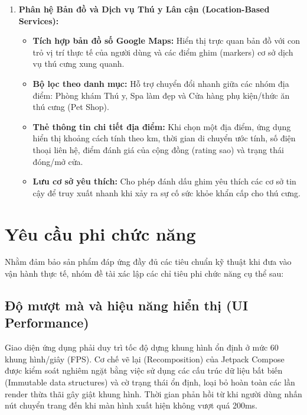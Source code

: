 \begin{enumerate}
    \item \textbf{Phân hệ Bản đồ và Dịch vụ Thú y Lân cận (Location-Based Services):}
    \begin{itemize}
        \item \textbf{Tích hợp bản đồ số Google Maps:} Hiển thị trực quan bản đồ với con trỏ vị trí thực tế của người dùng và các điểm ghim (markers) cơ sở dịch vụ thú cưng xung quanh.
        \item \textbf{Bộ lọc theo danh mục:} Hỗ trợ chuyển đổi nhanh giữa các nhóm địa điểm: Phòng khám Thú y, Spa làm đẹp và Cửa hàng phụ kiện/thức ăn thú cưng (Pet Shop).
        \item \textbf{Thẻ thông tin chi tiết địa điểm:} Khi chọn một địa điểm, ứng dụng hiển thị khoảng cách tính theo km, thời gian di chuyển ước tính, số điện thoại liên hệ, điểm đánh giá của cộng đồng (rating sao) và trạng thái đóng/mở cửa.
        \item \textbf{Lưu cơ sở yêu thích:} Cho phép đánh dấu ghim yêu thích các cơ sở tin cậy để truy xuất nhanh khi xảy ra sự cố sức khỏe khẩn cấp cho thú cưng.
    \end{itemize}
\end{enumerate}

\section{Yêu cầu phi chức năng}
\label{sec:yeu_cau_phi_chuc_nang}

Nhằm đảm bảo sản phẩm đáp ứng đầy đủ các tiêu chuẩn kỹ thuật khi đưa vào vận hành thực tế, nhóm đề tài xác lập các chỉ tiêu phi chức năng cụ thể sau:

\subsection{Độ mượt mà và hiệu năng hiển thị (UI Performance)}
Giao diện ứng dụng phải duy trì tốc độ dựng khung hình ổn định ở mức 60 khung hình/giây (FPS). Cơ chế vẽ lại (Recomposition) của Jetpack Compose được kiểm soát nghiêm ngặt bằng việc sử dụng các cấu trúc dữ liệu bất biến (Immutable data structures) và cờ trạng thái ổn định, loại bỏ hoàn toàn các lần render thừa thãi gây giật khung hình. Thời gian phản hồi từ khi người dùng nhấn nút chuyển trang đến khi màn hình xuất hiện không vượt quá 200ms.

